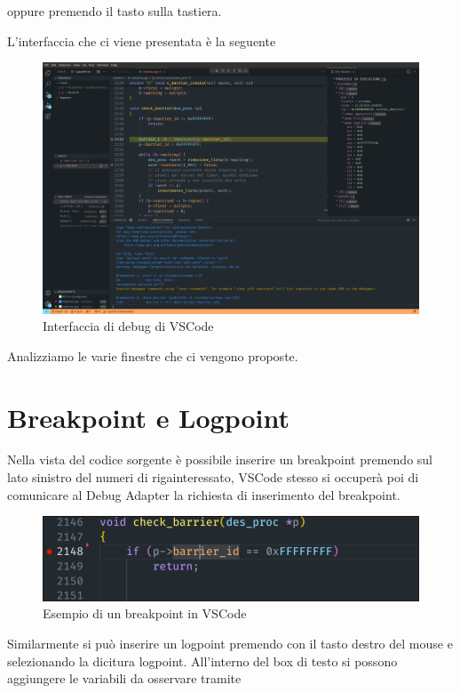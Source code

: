 oppure premendo il tasto  sulla tastiera.

L'interfaccia che ci viene presentata è la seguente 

\begin{figure}[H]
    \centering
    \includegraphics[width=\columnwidth]{images/fullDebug.png}
    \caption{Interfaccia di debug di  VSCode}
    \label{fig:debug screen}
\end{figure}

Analizziamo le varie finestre che ci vengono proposte.

\section{Breakpoint e Logpoint}
Nella vista del codice sorgente è possibile inserire un breakpoint premendo sul lato sinistro del numeri di rigainteressato, VSCode stesso si occuperà poi di comunicare al Debug Adapter la richiesta di inserimento del breakpoint.

\begin{figure}[H]
    \centering
    \includegraphics[width=0.7\columnwidth]{images/breakpoint_vscode.png}
    \caption{Esempio di un breakpoint in VSCode}
    \label{fig:breakpoint}
\end{figure}

Similarmente si può inserire un logpoint premendo con il tasto destro del mouse e selezionando la dicitura logpoint. All'interno del box di testo si possono aggiungere le variabili da osservare tramite 

